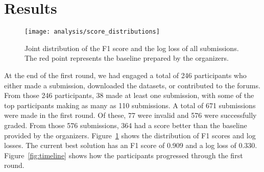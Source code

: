 \documentclass[sigconf]{acmart}
\begin{document}
\section{Results}


\begin{figure}[t]
\centering
\texttt{[image: analysis/score\_distributions]}
\caption[dummy]{Joint distribution of the F1 score and the log loss of all submissions.{\footnotemark} The red point represents the baseline prepared by the organizers.}
\label{fig:jointplot}
\end{figure}



At the end of the first round, we had engaged a total of 246 participants who either made a submission, downloaded the datasets, or contributed to the forums. From those 246 participants, 38 made at least one submission, with some of the top participants making as many as 110 submissions. %
A total of 671 submissions were made in the first round. Of these, 77 were invalid and 576 were successfully graded.
From those 576 submissions, 364 had a score better than the baseline provided by the organizers. Figure~\ref{fig:jointplot} shows the distribution of F1 scores and log losses.
The current best solution has an F1 score of 0.909 and a log loss of 0.330. %
Figure~\ref{fig:timeline} shows how the participants progressed through the first round.
\end{document}
